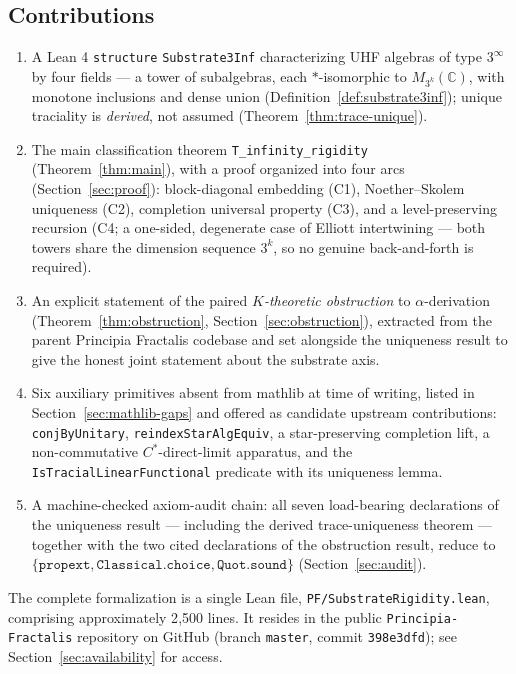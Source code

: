 \documentclass[11pt,a4paper]{article}
\theoremstyle{plain}
\theoremstyle{definition}
\begin{document}
\subsection*{Contributions}
\begin{enumerate}[leftmargin=*]
  \item A Lean 4 \texttt{structure} \texttt{Substrate3Inf} characterizing UHF algebras of type $3^{\infty}$ by four fields --- a tower of subalgebras, each $\ast$-isomorphic to $M_{3^k}(\mathbb{C})$, with monotone inclusions and dense union (Definition~\ref{def:substrate3inf}); unique traciality is \emph{derived}, not assumed (Theorem~\ref{thm:trace-unique}).
  \item The main classification theorem \texttt{T\_infinity\_rigidity} (Theorem~\ref{thm:main}), with a proof organized into four arcs (Section~\ref{sec:proof}): block-diagonal embedding (C1), Noether--Skolem uniqueness (C2), completion universal property (C3), and a level-preserving recursion (C4; a one-sided, degenerate case of Elliott intertwining --- both towers share the dimension sequence $3^k$, so no genuine back-and-forth is required).
  \item An explicit statement of the paired \emph{$K$-theoretic obstruction} to $\alpha$-derivation (Theorem~\ref{thm:obstruction}, Section~\ref{sec:obstruction}), extracted from the parent Principia Fractalis codebase and set alongside the uniqueness result to give the honest joint statement about the substrate axis.
  \item Six auxiliary primitives absent from mathlib at time of writing, listed in Section~\ref{sec:mathlib-gaps} and offered as candidate upstream contributions: \texttt{conjByUnitary}, \texttt{reindexStarAlgEquiv}, a star-preserving completion lift, a non-commutative $C^{\ast}$-direct-limit apparatus, and the \texttt{IsTracialLinearFunctional} predicate with its uniqueness lemma.
  \item A machine-checked axiom-audit chain: all seven load-bearing declarations of the uniqueness result --- including the derived trace-uniqueness theorem --- together with the two cited declarations of the obstruction result, reduce to $\{\texttt{propext}, \texttt{Classical.choice}, \texttt{Quot.sound}\}$ (Section~\ref{sec:audit}).
\end{enumerate}

The complete formalization is a single Lean file, \texttt{PF/SubstrateRigidity.lean}, comprising approximately 2{,}500 lines. It resides in the public \texttt{Principia-Fractalis} repository on GitHub (branch \texttt{master}, commit \texttt{398e3dfd}); see Section~\ref{sec:availability} for access.
\end{document}
